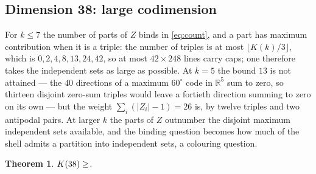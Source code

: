 \documentclass[11pt]{amsart}
\newtheorem{theorem}{Theorem}[section]
\theoremstyle{remark}
\newcommand{\R}{\mathbb{R}}
\begin{document}
\subsection{Dimension 38: large codimension}\label{ss:d38}

For $k\le7$ the number of parts of $Z$ binds in \eqref{eq:count}, and a part has
maximum contribution when it is a triple: the number of triples is at most
$\lfloor K(k)/3\rfloor$, which is $0,2,4,8,13,24,42$, so at most $42\times248$
lines carry caps; one therefore takes the independent sets as large as possible.
At $k=5$ the bound $13$ is not attained --- the $40$ directions of a maximum
$60^{\circ}$ code in $\R^{5}$ sum to zero, so thirteen disjoint zero-sum triples
would leave a fortieth direction summing to zero on its own --- but the weight
$\sum_{i}(|Z_{i}|-1)=26$ is, by twelve triples and two antipodal pairs. At larger
$k$ the parts of $Z$ outnumber the disjoint maximum independent sets available,
and the binding question becomes how much of the shell admits a partition into
independent sets, a colouring question.

\begin{theorem}\label{thm:38}
$K(38)\ge\Kh{38}$.
\end{theorem}
\end{document}
